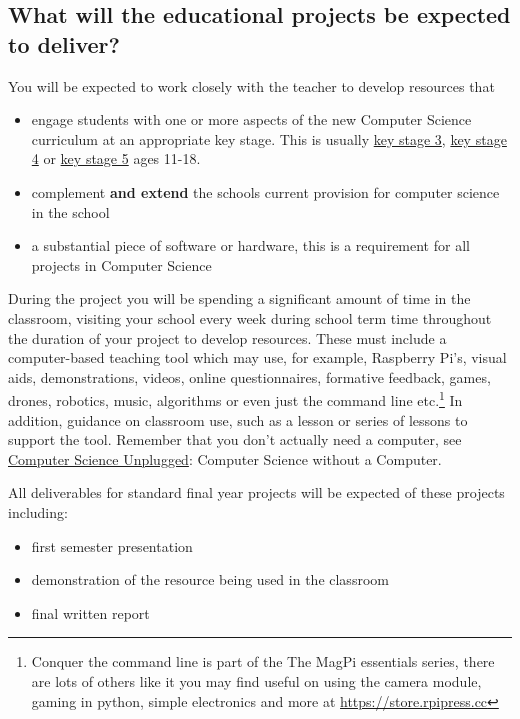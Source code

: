 \documentclass[
  12pt,
]{book}
\providecommand{\tightlist}{%
  \setlength{\itemsep}{0pt}\setlength{\parskip}{0pt}}
\begin{document}
\hypertarget{what-will-the-educational-projects-be-expected-to-deliver}{%
\subsection{What will the educational projects be expected to deliver?}\label{what-will-the-educational-projects-be-expected-to-deliver}}

You will be expected to work closely with the teacher to develop resources that

\begin{itemize}
\tightlist
\item
  engage students with one or more aspects of the new Computer Science curriculum at an appropriate key stage. This is usually \href{https://en.wikipedia.org/wiki/Key_Stage_3}{key stage 3}, \href{https://en.wikipedia.org/wiki/Key_Stage_4}{key stage 4} or \href{https://en.wikipedia.org/wiki/Key_Stage_5}{key stage 5} ages 11-18.
\item
  complement \textbf{and extend} the schools current provision for computer science in the school
\item
  a substantial piece of software or hardware, this is a requirement for all projects in Computer Science
\end{itemize}

During the project you will be spending a significant amount of time in the classroom, visiting your school every week during school term time throughout the duration of your project to develop resources. These must include a computer-based teaching tool which may use, for example, Raspberry Pi's, visual aids, demonstrations, videos, online questionnaires, formative feedback, games, drones, robotics, music, \citep{Aaron2016} algorithms \citep{Kubica2012} or even just the command line \citep{conquerthecommandline} etc.\footnote{Conquer the command line is part of the The MagPi essentials series, there are lots of others like it you may find useful on using the camera module, gaming in python, simple electronics and more at \url{https://store.rpipress.cc}} In addition, guidance on classroom use, such as a lesson or series of lessons to support the tool. Remember that you don't actually need a computer, see \href{https://csunplugged.org}{Computer Science Unplugged}: Computer Science without a Computer. \citep{Bell2018}

All deliverables for standard final year projects will be expected of these projects including:

\begin{itemize}
\tightlist
\item
  first semester presentation
\item
  demonstration of the resource being used in the classroom
\item
  final written report
\end{itemize}
\end{document}
